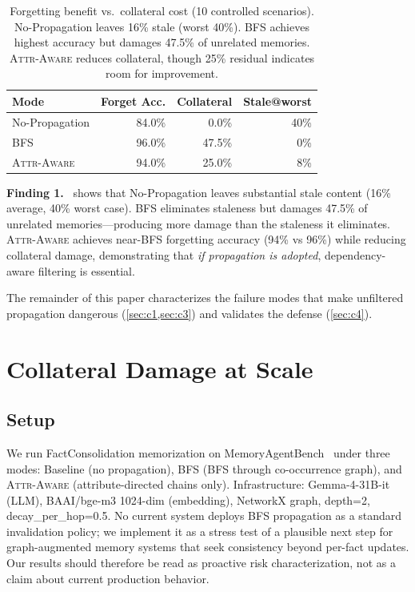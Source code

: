\documentclass{article}
\newcommand{\attraware}{\textsc{Attr-Aware}}
\newcommand{\bfsprop}{\textsc{BFS}}
\newcommand{\finding}[1]{\vspace{2pt}\noindent\textbf{Finding #1.}~}
\begin{document}
\begin{table}[htbp]
\centering
\footnotesize
\setlength{\tabcolsep}{3pt}
\begin{tabular}{lrrr}
\toprule
\textbf{Mode} & \textbf{Forget Acc.} & \textbf{Collateral} & \textbf{Stale@worst} \\
\midrule
No-Propagation & 84.0\% & 0.0\% & 40\% \\
\bfsprop{} & 96.0\% & 47.5\% & 0\% \\
\attraware{} & 94.0\% & 25.0\% & 8\% \\
\bottomrule
\end{tabular}
\caption{Forgetting benefit vs.\ collateral cost (10 controlled scenarios).
No-Propagation leaves 16\% stale (worst 40\%).
BFS achieves highest accuracy but damages 47.5\% of unrelated memories.
\attraware{} reduces collateral, though 25\% residual indicates room for improvement.}
\label{tab:forgetting}
\end{table}

\finding{1}
 shows that No-Propagation leaves substantial stale content (16\% average, 40\% worst case).
BFS eliminates staleness but damages 47.5\% of unrelated memories---producing more damage than the staleness it eliminates.
\attraware{} achieves near-BFS forgetting accuracy (94\% vs 96\%) while reducing collateral damage, demonstrating that \textit{if propagation is adopted}, dependency-aware filtering is essential.

The remainder of this paper characterizes the failure modes that make unfiltered propagation dangerous (\cref{sec:c1,sec:c3}) and validates the defense (\cref{sec:c4}).


\section{Collateral Damage at Scale}
\label{sec:c1}

\subsection{Setup}

We run FactConsolidation memorization on MemoryAgentBench~\citep{memoryagentbench_2026} under three modes: Baseline (no propagation), \bfsprop{} (BFS through co-occurrence graph), and \attraware{} (attribute-directed chains only).
Infrastructure: Gemma-4-31B-it (LLM), BAAI/bge-m3 1024-dim (embedding), NetworkX graph, depth=2, decay\_per\_hop=0.5.
No current system deploys BFS propagation as a standard invalidation policy; we implement it as a stress test of a plausible next step for graph-augmented memory systems that seek consistency beyond per-fact updates.
Our results should therefore be read as proactive risk characterization, not as a claim about current production behavior.
\end{document}
